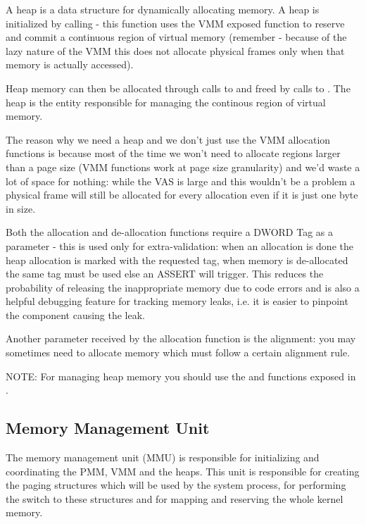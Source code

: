 \begin{appendices}
A heap is a data structure for dynamically allocating memory. A heap is initialized by calling
 - this function uses the VMM exposed function  to
reserve and commit a continuous region of virtual memory (remember - because of the lazy nature of
the VMM this does not allocate physical frames only when that memory is actually accessed).

Heap memory can then be allocated through calls to  and freed by calls
to . The heap is the entity responsible for managing the continous region
of virtual memory.

The reason why we need a heap and we don't just use the VMM allocation functions is because most of
the time we won't need to allocate regions larger than a page size (VMM functions work at page size
granularity) and we'd waste a lot of space for nothing: while the VAS is large and this wouldn't be
a problem a physical frame will still be allocated for every allocation even if it is just one byte
in size.

Both the allocation and de-allocation functions require a DWORD Tag as a parameter - this is used
only for extra-validation: when an allocation is done the heap allocation is marked with the
requested tag, when memory is de-allocated the same tag must be used else an ASSERT will trigger.
This reduces the probability of releasing the inappropriate memory due to code errors and is also a
helpful debugging feature for tracking memory leaks, i.e. it is easier to pinpoint the component
causing the leak.

Another parameter received by the allocation function is the alignment: you may sometimes need to
allocate memory which must follow a certain alignment rule.

NOTE: For managing heap memory you should use the  and 
 functions exposed in .

\subsection{Memory Management Unit}
\label{sect:MMU}

The memory management unit (MMU) is responsible for initializing and coordinating the PMM, VMM and
the heaps. This unit is responsible for creating the paging structures which will be used by the
system process, for performing the switch to these structures and for mapping and reserving the
whole kernel memory.


\end{appendices}
